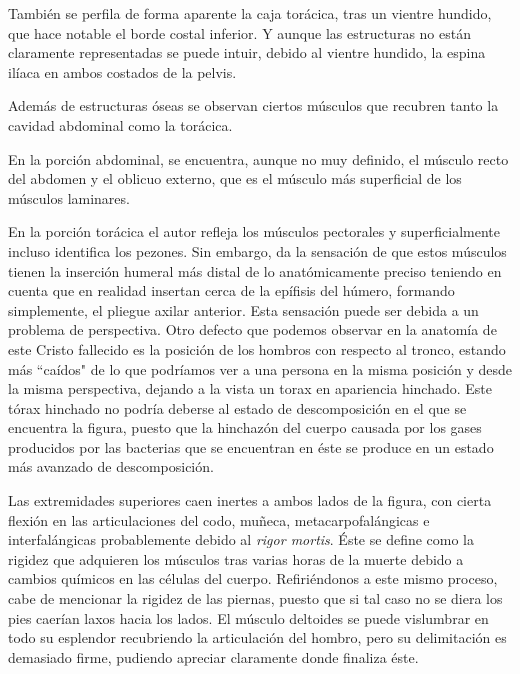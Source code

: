 También se perfila de forma aparente la caja torácica, tras un vientre hundido, que hace notable el borde costal inferior. Y aunque las estructuras no están claramente representadas se puede intuir, debido al vientre hundido, la espina ilíaca en ambos costados de la pelvis.

Además de estructuras óseas se observan ciertos músculos que recubren tanto la cavidad abdominal como la torácica.

En la porción abdominal, se encuentra, aunque no muy definido, el músculo recto del abdomen y el oblicuo externo, que es el músculo más superficial de los músculos laminares.

En la porción torácica el autor refleja los músculos pectorales y superficialmente incluso identifica los pezones. Sin embargo, da la sensación de que estos músculos tienen la inserción humeral más distal de lo anatómicamente preciso teniendo en cuenta que en realidad insertan cerca de la epífisis del húmero, formando simplemente, el pliegue axilar anterior. Esta sensación puede ser debida a un problema de perspectiva. Otro defecto que podemos observar en la anatomía de este Cristo fallecido es la posición de los hombros con respecto al tronco, estando más ``caídos" de lo que podríamos ver a una persona en la misma posición y desde la misma perspectiva, dejando a la vista un torax en apariencia hinchado. Este tórax hinchado no podría deberse al estado de descomposición en el que se encuentra la figura, puesto que la hinchazón del cuerpo causada por los gases producidos por las bacterias que se encuentran en éste se produce en un estado más avanzado de descomposición.

Las extremidades superiores caen inertes a ambos lados de la figura, con cierta flexión en las articulaciones del codo, muñeca, metacarpofalángicas e interfalángicas probablemente debido al \textit{rigor mortis}. Éste se define como la rigidez que adquieren los músculos tras varias horas de la muerte debido a cambios químicos en las células del cuerpo. Refiriéndonos a este mismo proceso, cabe de mencionar la rigidez de las piernas, puesto que si tal caso no se diera los pies caerían laxos hacia los lados. El músculo deltoides se puede vislumbrar en todo su esplendor recubriendo la articulación del hombro, pero su delimitación es demasiado firme, pudiendo apreciar claramente donde finaliza éste.
